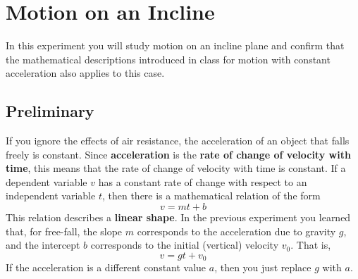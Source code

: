 \setcounter{chapter}{2}
\chapter{Motion on an Incline}
In this experiment you will study motion on an incline plane and confirm that the mathematical descriptions introduced in class for motion with constant acceleration also applies to this case.
\section{Preliminary}
If you ignore the effects of air resistance, the acceleration of an object that falls freely is constant. Since \textbf{acceleration} is the \textbf{rate of change of velocity with time}, this means that the rate of change of velocity with time is constant. If a dependent variable $v$ has a constant rate of change with respect to an independent variable $t$, then there is a mathematical relation of the form
\begin{equation}
    v = m t + b
    \label{eq:02.v.linear}
\end{equation}
This relation describes a \textbf{linear shape}. In the previous experiment you learned that, for free-fall, the slope $m$ corresponds to the acceleration due to gravity $g$, and the intercept $b$ corresponds to the initial (vertical) velocity $v_{0}$. That is,
\begin{equation}
    v = g t + v_{0}
\end{equation}
If the acceleration is a different constant value $a$, then you just replace $g$ with $a$.

